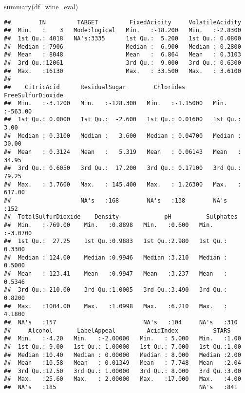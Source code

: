\documentclass[
]{article}
\newenvironment{Shaded}{\begin{snugshade}}{\end{snugshade}}
\newcommand{\FunctionTok}[1]{\textcolor[rgb]{0.00,0.00,0.00}{#1}}
\newcommand{\NormalTok}[1]{#1}
\begin{document}
\begin{Shaded}
\begin{Highlighting}[]
\FunctionTok{summary}\NormalTok{(df\_wine\_eval)}
\end{Highlighting}
\end{Shaded}

\begin{verbatim}
##        IN         TARGET         FixedAcidity     VolatileAcidity  
##  Min.   :    3   Mode:logical   Min.   :-18.200   Min.   :-2.8300  
##  1st Qu.: 4018   NA's:3335      1st Qu.:  5.200   1st Qu.: 0.0800  
##  Median : 7906                  Median :  6.900   Median : 0.2800  
##  Mean   : 8048                  Mean   :  6.864   Mean   : 0.3103  
##  3rd Qu.:12061                  3rd Qu.:  9.000   3rd Qu.: 0.6300  
##  Max.   :16130                  Max.   : 33.500   Max.   : 3.6100  
##                                                                    
##    CitricAcid      ResidualSugar        Chlorides        FreeSulfurDioxide
##  Min.   :-3.1200   Min.   :-128.300   Min.   :-1.15000   Min.   :-563.00  
##  1st Qu.: 0.0000   1st Qu.:  -2.600   1st Qu.: 0.01600   1st Qu.:   3.00  
##  Median : 0.3100   Median :   3.600   Median : 0.04700   Median :  30.00  
##  Mean   : 0.3124   Mean   :   5.319   Mean   : 0.06143   Mean   :  34.95  
##  3rd Qu.: 0.6050   3rd Qu.:  17.200   3rd Qu.: 0.17100   3rd Qu.:  79.25  
##  Max.   : 3.7600   Max.   : 145.400   Max.   : 1.26300   Max.   : 617.00  
##                    NA's   :168        NA's   :138        NA's   :152      
##  TotalSulfurDioxide    Density             pH          Sulphates      
##  Min.   :-769.00    Min.   :0.8898   Min.   :0.600   Min.   :-3.0700  
##  1st Qu.:  27.25    1st Qu.:0.9883   1st Qu.:2.980   1st Qu.: 0.3300  
##  Median : 124.00    Median :0.9946   Median :3.210   Median : 0.5000  
##  Mean   : 123.41    Mean   :0.9947   Mean   :3.237   Mean   : 0.5346  
##  3rd Qu.: 210.00    3rd Qu.:1.0005   3rd Qu.:3.490   3rd Qu.: 0.8200  
##  Max.   :1004.00    Max.   :1.0998   Max.   :6.210   Max.   : 4.1800  
##  NA's   :157                         NA's   :104     NA's   :310      
##     Alcohol       LabelAppeal         AcidIndex          STARS     
##  Min.   :-4.20   Min.   :-2.00000   Min.   : 5.000   Min.   :1.00  
##  1st Qu.: 9.00   1st Qu.:-1.00000   1st Qu.: 7.000   1st Qu.:1.00  
##  Median :10.40   Median : 0.00000   Median : 8.000   Median :2.00  
##  Mean   :10.58   Mean   : 0.01349   Mean   : 7.748   Mean   :2.04  
##  3rd Qu.:12.50   3rd Qu.: 1.00000   3rd Qu.: 8.000   3rd Qu.:3.00  
##  Max.   :25.60   Max.   : 2.00000   Max.   :17.000   Max.   :4.00  
##  NA's   :185                                         NA's   :841
\end{verbatim}
\end{document}
